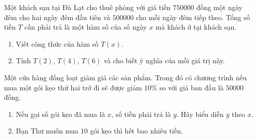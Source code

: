 \begin{vd}%
	Một khách sạn tại Đà Lạt cho thuê phòng với giá tiền $750000$ đồng một ngày đêm cho hai ngày đêm đầu tiên và $500000$ cho mỗi ngày đêm tiếp theo. Tổng số tiền $T$ cần phải trả là một hàm số của số ngày $x$ mà khách ở tại khách sạn.
	\begin{enumerate}
		\item Viết công thức của hàm số $T(x)$.
		\item Tính $T(2)$, $T(4)$, $T(6)$ và cho biết ý nghĩa của mỗi giá trị này.
	\end{enumerate}
\end{vd}
\baitaptl
\begin{bt}%
	Một cửa hàng đồng loạt giảm giá các sản phẩm. Trong đó có chương trình nếu mua một gói kẹo thứ hai trở đi sẽ được giảm $10\%$ so với giá ban đầu là $50000$ đồng. 
	\begin{enumerate}
		\item Nếu gọi số gói kẹo đã mua là $x$, số tiền phải trả là $y$. Hãy biểu diễn $y$ theo $x$.
		\item Bạn Thư muốn mua $10$ gói kẹo thì hết bao nhiêu tiền.
	\end{enumerate}
	
\end{bt}

